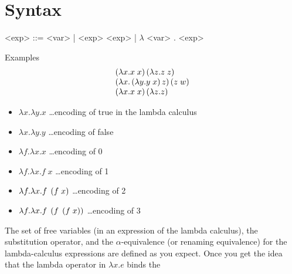 \section{Syntax}

\begin{center}
	\begin{minipage}{0.55\textwidth}
		\begin{grammar}
			<exp> ::= <var>
			| <exp> <exp> \footnotemark
			| $\lambda$ <var> . <exp> \footnotemark
		\end{grammar}
	\end{minipage}
\end{center}

\begin{enumcirc}
	\item
	Examples
	\[
		\begin{array}{l}
			\left( \lambda x. x \; x \right) \left( \lambda z. z \; z \right)           \\
			\left( \lambda x. \left( \lambda y. y \; x \right) z \right) \left( z \; w \right) \\
			\left( \lambda x. x \; x \right) \left( \lambda z. z \right)                \\
		\end{array}
	\]
	\begin{itemize}
		\item
		      $\lambda x. \lambda y. x$ \dots encoding of true in the lambda calculus
		\item
		      $\lambda x. \lambda y. y$ \dots encoding of false
		\item
		      $\lambda f. \lambda x. x$ \dots encoding of 0
		\item
		      $\lambda f. \lambda x. f \; x$ \dots encoding of 1
		\item
		      $\lambda f. \lambda x. f \; \left( f \; x \right)$ \dots encoding of 2
		\item
		      $\lambda f. \lambda x. f \; \left( f \; \left( f \; x \right) \right)$ \dots encoding of 3
	\end{itemize}
	\item
	The set of free variables (in an expression of the lambda calculus), the
	substitution operator, and the $\alpha$-equivalence (or renaming equivalence)
	for the lambda-calculus expressions are defined as you expect.
	Once you get the idea that the lambda operator in $\lambda x. e$ binds the

\end{enumcirc}
